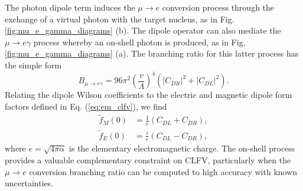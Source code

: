 \documentclass{book}[letterpaper,12pt]
\begin{document}
The photon dipole term induces the $\mu\rightarrow e$ conversion process through the exchange of a virtual photon with the target nucleus, as in Fig. \ref{fig:mu_e_gamma_diagrams} (b). The dipole operator can also mediate the $\mu\rightarrow e\gamma$ process whereby an on-shell photon is produced, as in Fig. \ref{fig:mu_e_gamma_diagrams} (a). The branching ratio for this latter process has the simple form 
\begin{equation}
B_{\mu\rightarrow e\gamma}=96\pi^2\left(\frac{v}{\Lambda}\right)^4\left(|C_{DR}|^2+|C_{DL}|^2\right).
\end{equation} 
Relating the dipole Wilson coefficients to the electric and magnetic dipole form factors defined in Eq. (\ref{eq:em_clfv}), we find
\begin{equation}
\begin{split}
\tilde{f}_M(0)&=\frac{1}{e}\left(C_{DL}+C_{DR}\right),\\
\tilde{f}_E(0)&=\frac{i}{e}\left(C_{DL}-C_{DR}\right),
\end{split}
\end{equation}
where $e=\sqrt{4\pi\alpha}$ is the elementary electromagnetic charge. The on-shell process provides a valuable complementary constraint on CLFV, particularly when the $\mu\rightarrow e$ conversion branching ratio can be computed to high accuracy with known uncertainties.
\end{document}
